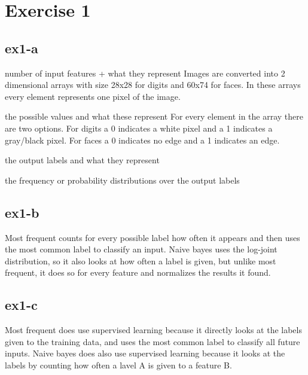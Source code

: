 \section{Exercise 1}
\label{sec:ex1}
\subsection{ex1-a}
number of input features + what they represent \n
Images are converted into 2 dimensional arrays with size 28x28 for digits and 60x74 for faces.
In these arrays every element represents one pixel of the image. 

the possible values and what these represent \n
For every element in the array there are two options. For digits a 0 indicates a white pixel
and a 1 indicates a gray/black pixel. For faces a 0 indicates no edge and a 1 indicates an edge.


the output labels and what they represent \n


the frequency or probability distributions over the output labels \n

\subsection{ex1-b}
Most frequent counts for every possible label how often it appears and then uses the most
common label to classify an input.
Naive bayes uses the log-joint distribution, so it also looks at how often a label is given,
but unlike most frequent, it does so for every feature and normalizes the results it found.

\subsection{ex1-c}
Most frequent does use supervised learning because it directly looks at the labels given 
to the training data, and uses the most common label to classify all future inputs.
Naive bayes does also use supervised learning because it looks at the labels by counting 
how often a lavel A is given to a feature B.